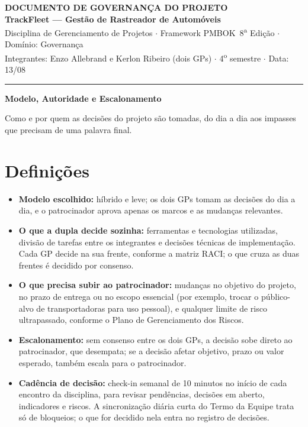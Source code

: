 \documentclass[11pt,a4paper]{article}
\newcommand{\cabecalho}[3]{%
  \begin{center}
  {\Large\bfseries DOCUMENTO DE #1 DO PROJETO}\\[2pt]
  {\large\bfseries TrackFleet --- Gestão de Rastreador de Automóveis}\\[4pt]
  Disciplina de Gerenciamento de Projetos $\cdot$ Framework PMBOK\textregistered\ 8\textsuperscript{a} Edição $\cdot$ Domínio: #2\\[2pt]
  Integrantes: Enzo Allebrand e Kerlon Ribeiro (dois GPs) $\cdot$ 4\textsuperscript{o} semestre $\cdot$ Data: #3
  \end{center}
  \vspace{2mm}\hrule\vspace{4mm}}
\newcommand{\parte}[1]{\noindent\textbf{\large #1}\par\vspace{1mm}}
\begin{document}
\cabecalho{GOVERNANÇA}{Governança}{13/08}

\parte{Modelo, Autoridade e Escalonamento}
\noindent Como e por quem as decisões do projeto são tomadas, do dia a dia aos impasses que precisam de uma palavra final.

\section{Definições}
\begin{itemize}[itemsep=4pt]
  \item \textbf{Modelo escolhido:} híbrido e leve; os dois GPs tomam as decisões do dia a dia, e o patrocinador aprova apenas os marcos e as mudanças relevantes.
  \item \textbf{O que a dupla decide sozinha:} ferramentas e tecnologias utilizadas, divisão de tarefas entre os integrantes e decisões técnicas de implementação. Cada GP decide na sua frente, conforme a matriz RACI; o que cruza as duas frentes é decidido por consenso.
  \item \textbf{O que precisa subir ao patrocinador:} mudanças no objetivo do projeto, no prazo de entrega ou no escopo essencial (por exemplo, trocar o público-alvo de transportadoras para uso pessoal), e qualquer limite de risco ultrapassado, conforme o Plano de Gerenciamento dos Riscos.
  \item \textbf{Escalonamento:} sem consenso entre os dois GPs, a decisão sobe direto ao patrocinador, que desempata; se a decisão afetar objetivo, prazo ou valor esperado, também escala para o patrocinador.
  \item \textbf{Cadência de decisão:} check-in semanal de 10 minutos no início de cada encontro da disciplina, para revisar pendências, decisões em aberto, indicadores e riscos. A sincronização diária curta do Termo da Equipe trata só de bloqueios; o que for decidido nela entra no registro de decisões.
\end{itemize}
\end{document}
